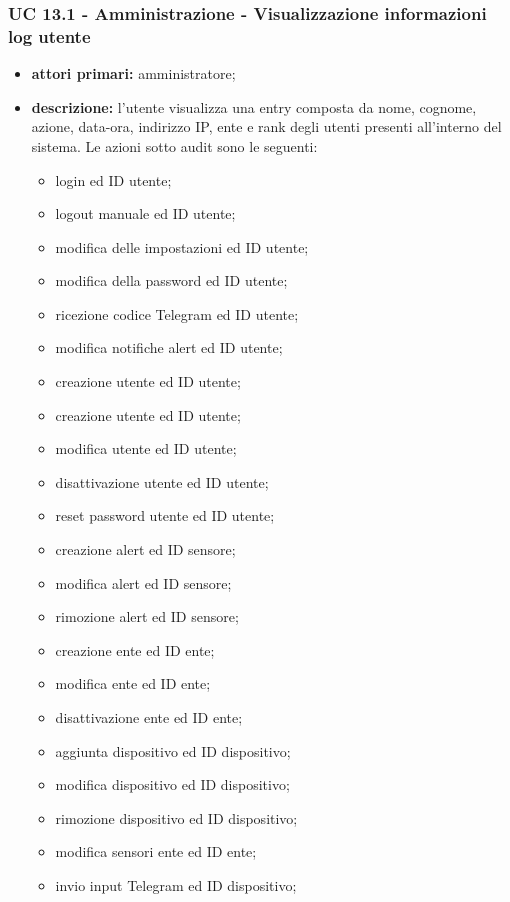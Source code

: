 		\subsubsection{UC 13.1 - Amministrazione - Visualizzazione informazioni log utente}
		\begin{itemize}
			\item \textbf{attori primari:} amministratore;
			\item \textbf{descrizione:} l'utente visualizza una entry composta da nome, cognome, azione, data-ora, indirizzo IP, ente e rank degli utenti presenti all'interno del sistema. Le azioni sotto audit sono le seguenti:

			\begin{itemize}
				\item login ed ID utente;
				\item logout manuale ed ID utente;
				\item modifica delle impostazioni ed ID utente;
				\item modifica della password ed ID utente;
				\item ricezione codice Telegram ed ID utente;
				\item modifica notifiche alert ed ID utente;
				\item creazione utente ed ID utente;
				\item creazione utente ed ID utente;
				\item modifica utente ed ID utente;
				\item disattivazione utente ed ID utente;
				\item reset password utente ed ID utente;
				\item creazione alert ed ID sensore;
				\item modifica alert ed ID sensore;
				\item rimozione alert ed ID sensore;
				\item creazione ente ed ID ente;
				\item modifica ente ed ID ente;
				\item disattivazione ente ed ID ente;
				\item aggiunta dispositivo ed ID dispositivo;
				\item modifica dispositivo ed ID dispositivo;
				\item rimozione dispositivo ed ID dispositivo;
				\item modifica sensori ente ed ID ente;
				\item invio input Telegram ed ID dispositivo;
			\end{itemize}


\end{itemize}
